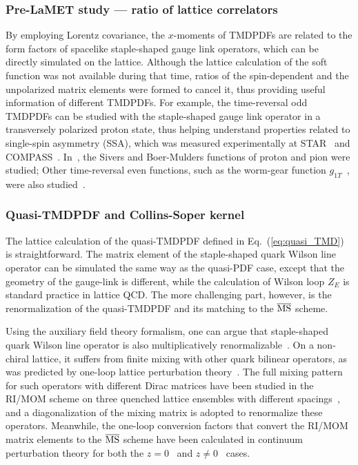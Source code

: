 \documentclass[aps,rmp,reprint,amsmath,amssymb,graphicx,longbibliography]{revtex4-1} %
\DeclareRobustCommand{\eq}[1]{Eq.~(\ref{eq:#1})}
\begin{document}
\subsubsection{Pre-LaMET study --- ratio of lattice correlators}

By employing Lorentz covariance, the $x$-moments of TMDPDFs are related to the form factors of spacelike staple-shaped gauge link operators, which can be directly simulated on the lattice. Although the lattice calculation of the soft function was not available during that time, ratios of the spin-dependent and the unpolarized matrix elements were formed to cancel it, thus providing useful information of different TMDPDFs.
For example, the time-reversal odd TMDPDFs can be studied with the staple-shaped gauge link operator in a transversely polarized proton state, thus helping understand properties related to single-spin asymmetry (SSA), which was measured experimentally at STAR~\cite{Adamczyk:2015gyk}
and COMPASS~\cite{Aghasyan:2017jop}.
%
In~\cite{Musch:2011er,Engelhardt:2015xja}, the Sivers and Boer-Mulders functions of proton and pion were studied; Other time-reversal even functions, such as the worm-gear function $g_{1T}$~\cite{Tangerman:1994eh}, were also studied~\cite{Yoon:2017qzo}.

\subsubsection{Quasi-TMDPDF and Collins-Soper kernel}

The lattice calculation of the quasi-TMDPDF defined in \eq{quasi_TMD} is straightforward.
The matrix element of the staple-shaped quark Wilson line operator can be simulated the same way as the quasi-PDF case, except that the geometry of the gauge-link is different, while the calculation of Wilson loop $Z_E$ is standard practice in lattice QCD. The more challenging part, however, is the renormalization of the quasi-TMDPDF and its matching to the $\overline{\rm MS}$ scheme.

Using the auxiliary field theory formalism, one can argue that staple-shaped quark Wilson line operator is also multiplicatively renormalizable~\cite{Ebert:2019tvc,Green:2020xco}. On a non-chiral lattice, it suffers from finite mixing with other quark bilinear operators, as was predicted by one-loop lattice perturbation theory~\cite{Constantinou:2019vyb}. The full mixing pattern for such operators with different Dirac matrices have been studied in the RI/MOM scheme on three quenched lattice ensembles with different spacings~\cite{Shanahan:2019zcq}, and a diagonalization of the mixing matrix is adopted to renormalize these operators. Meanwhile, the one-loop conversion factors that convert the RI/MOM matrix elements to the $\overline{\rm MS}$ scheme have been calculated in continuum perturbation theory for both the $z=0$~\cite{Constantinou:2019vyb} and $z\neq0$~\cite{Ebert:2019tvc} cases.
\end{document}
